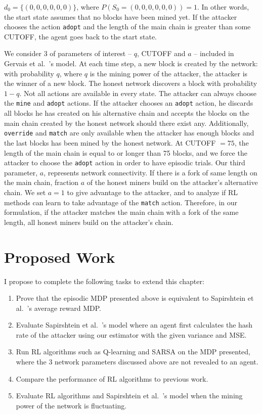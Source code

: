  $d_0 = \{(0, 0, 0, 0, 0, 0)\}$, where $P(S_0 = (0, 0, 0, 0, 0, 0)) = 1$. In other words, the start state assumes that no blocks have been mined yet. If the attacker chooses the action \texttt{adopt} and the length of the main chain is greater than some CUTOFF, the agent goes back to the start state.

 We consider 3 of parameters of interest -- $q$, CUTOFF and $a$ -- included in Gervais et al.~\cite{Gervais:2016}'s model. At each time step, a new block is created by the network: with probability $q$, where $q$ is the mining power of the attacker, the attacker is the winner of a new block. The honest network discovers a block with probability $1-q$. Not all actions are available in every state. The attacker can always choose the \texttt{mine} and \texttt{adopt} actions. If the attacker chooses an {\tt adopt} action, he discards all blocks he has created on his alternative chain and accepts the blocks on the main chain created by the honest network should there exist any. Additionally, \texttt{override} and \texttt{match} are only available when the attacker has enough blocks and the last blocks has been mined by the honest network. At CUTOFF $= 75$, the length of the main chain is equal to or longer than 75 blocks, and we force the attacker to choose the \texttt{adopt} action in order to have episodic trials. Our third parameter, $a$, represents network connectivity. If there is a fork of same length on the main chain, fraction $a$ of the honest miners build on the attacker's alternative chain. We set $a=1$ to give advantage to the attacker, and to analyze if RL methods can learn to take advantage of the \texttt{match} action. Therefore, in our formulation, if the attacker matches the main chain with a fork of the same length, all honest miners build on the attacker's chain. 

\section{Proposed Work}\label{section:selfishRL-proposed-work}
I propose to complete the following tasks to extend this chapter:
\begin{enumerate}
\item Prove that the episodic MDP presented above is equivalent to Sapirshtein et al.~\cite{sapirshtein:2015}'s average reward MDP.
\item Evaluate Sapirshtein et al.~\cite{sapirshtein:2015}'s model where an agent first calculates the hash rate of the attacker using our estimator with the given variance and MSE.
\item Run RL algorithms such as Q-learning and SARSA on the MDP presented, where the 3 network parameters discussed above are not revealed to an agent.
\item Compare the performance of RL algorithms to previous work.
\item Evaluate RL algorithms and Sapirshtein et al.~\cite{sapirshtein:2015}'s model when the mining power of the network is fluctuating.
\end{enumerate}

